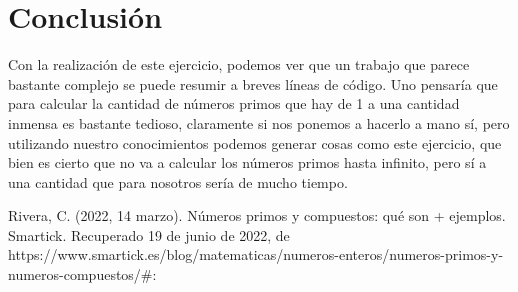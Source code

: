 \documentclass{article}
\begin{document}
\section{Conclusión}
Con la realización de este ejercicio, podemos ver que un trabajo que parece bastante complejo se puede resumir a breves líneas de código. Uno pensaría que para calcular la cantidad de números primos que hay de 1 a una cantidad inmensa es bastante tedioso, claramente si nos ponemos a hacerlo a mano sí, pero utilizando nuestro conocimientos podemos generar cosas como este ejercicio, que bien es cierto que no va a calcular los números primos hasta infinito, pero sí a una cantidad que para nosotros sería de mucho tiempo.
\newline
\newline
\newline
\newline
\newline
\newline
\newline
\begin{thebibliography}{}
    Rivera, C. (2022, 14 marzo). Números primos y compuestos: qué son + ejemplos. Smartick. Recuperado 19 de junio de 2022, de https://www.smartick.es/blog/matematicas/numeros-enteros/numeros-primos-y-numeros-compuestos/#:%
\end{thebibliography}
\end{document}
